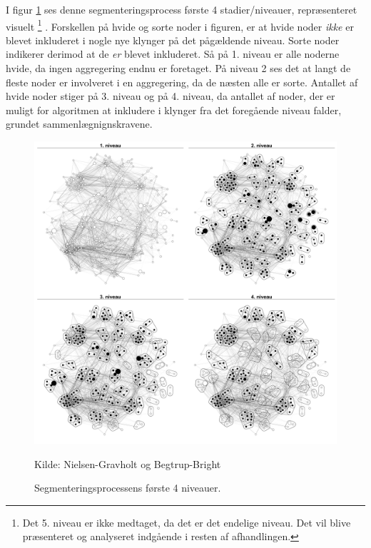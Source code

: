 I figur \ref{fig_analyse_deskriptivt_kort_seg_proces} ses denne segmenteringsprocess første 4 stadier/niveauer, repræsenteret visuelt%
%
\footnote{Det 5. niveau er ikke medtaget, da det er det endelige niveau. Det vil blive præsenteret og analyseret indgående i resten af afhandlingen.}%
%
. Forskellen på hvide og sorte noder i figuren, er at hvide noder \emph{ikke} er blevet inkluderet i nogle nye klynger på det pågældende niveau. Sorte noder indikerer derimod at de \emph{er} blevet inkluderet. Så på 1. niveau er alle noderne hvide, da ingen aggregering endnu er foretaget. På niveau 2 ses det at langt de fleste noder er involveret i en aggregering, da de næsten alle er sorte. Antallet af hvide noder stiger på 3. niveau og på 4. niveau, da antallet af noder, der er muligt for algoritmen at inkludere i klynger fra det foregående niveau falder, grundet sammenlægnignskravene.   

%
%
\begin{figure}[H]
\begin{center}
	\caption{Segmenteringsprocessens første 4 niveauer.}
	\label{fig_analyse_deskriptivt_kort_seg_proces}
	\includegraphics[width=1.0\textwidth]{fig/netvaerkskort/kort_seg_proces.pdf}
	\centerline{ \tiny{Kilde: Nielsen-Gravholt og Begtrup-Bright}}
\end{center}
\end{figure}
\restoregeometry
%
%

